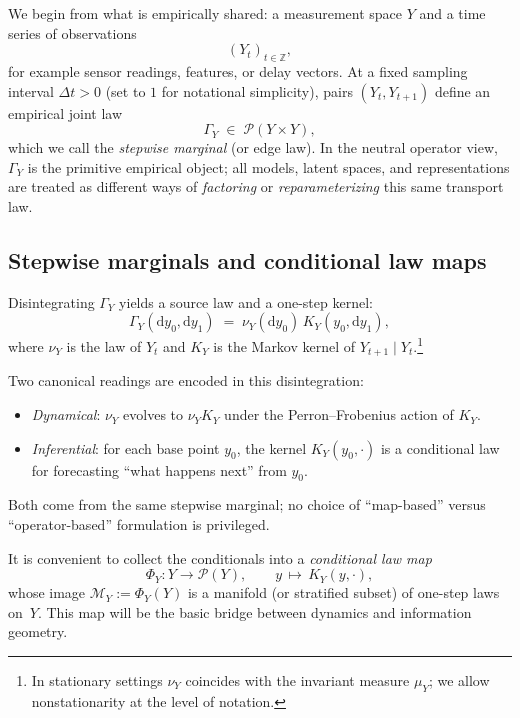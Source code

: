 \documentclass[11pt]{article}
\newcommand{\1}{\mathbf{1}}
\begin{document}
We begin from what is empirically shared: a measurement space $Y$ and a time series of observations
\[
  (Y_t)_{t\in\mathbb{Z}},
\]
for example sensor readings, features, or delay vectors. At a fixed sampling interval $\Delta t>0$ (set to $1$ for notational simplicity), pairs $(Y_t,Y_{t+1})$ define an empirical joint law
\[
  \Gamma_Y \;\in\; \mathcal{P}(Y\times Y),
\]
which we call the \emph{stepwise marginal} (or edge law). In the neutral operator view, $\Gamma_Y$ is the primitive empirical object; all models, latent spaces, and representations are treated as different ways of \emph{factoring} or \emph{reparameterizing} this same transport law.

\subsection{Stepwise marginals and conditional law maps}
\label{subsec:stepwise-marginals}

Disintegrating $\Gamma_Y$ yields a source law and a one-step kernel:
\[
  \Gamma_Y(\mathrm dy_0,\mathrm dy_1)
  \;=\;
  \nu_Y(\mathrm dy_0)\,K_Y(y_0,\mathrm dy_1),
\]
where $\nu_Y$ is the law of $Y_t$ and $K_Y$ is the Markov kernel of $Y_{t+1}\mid Y_t$.\footnote{In stationary settings $\nu_Y$ coincides with the invariant measure $\mu_Y$; we allow nonstationarity at the level of notation.}

Two canonical readings are encoded in this disintegration:
\begin{itemize}[leftmargin=1.5em]
  \item \emph{Dynamical}: $\nu_Y$ evolves to $\nu_Y K_Y$ under the Perron--Frobenius action of $K_Y$.
  \item \emph{Inferential}: for each base point $y_0$, the kernel $K_Y(y_0,\cdot)$ is a conditional law for forecasting ``what happens next'' from $y_0$.
\end{itemize}
Both come from the same stepwise marginal; no choice of ``map-based'' versus ``operator-based'' formulation is privileged.

It is convenient to collect the conditionals into a \emph{conditional law map}
\[
  \Phi_Y : Y \longrightarrow \mathcal{P}(Y),
  \qquad
  y \,\longmapsto\, K_Y(y,\cdot),
\]
whose image $\mathcal{M}_Y := \Phi_Y(Y)$ is a manifold (or stratified subset) of one-step laws on~$Y$. This map will be the basic bridge between dynamics and information geometry.

\end{document}
